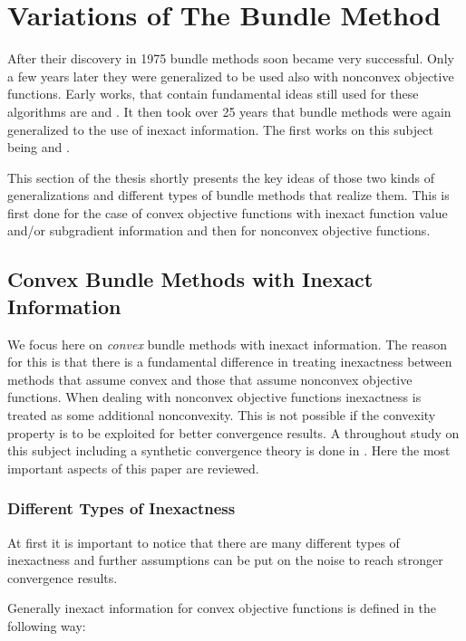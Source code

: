 \section{Variations of The Bundle Method}

After their discovery in 1975 bundle methods soon became very successful. Only a few years later they were generalized to be used also with nonconvex objective functions. Early works, that contain fundamental ideas still used for these algorithms are \cite{Mifflin1982} and \cite{Kiwiel1985}.
It then took over 25 years that bundle methods were again generalized to the use of inexact information. The first works on this subject being \cite{Hintermueller2001,Kiwiel2006} and \cite{Solodov2003}.

This section of the thesis shortly presents the key ideas of those two kinds of generalizations and different types of bundle methods that realize them.
This is first done for the case of convex objective functions with inexact function value and/or subgradient information and then for nonconvex objective functions. 

\subsection{Convex Bundle Methods with Inexact Information}

We focus here on \emph{convex} bundle methods with inexact information. The reason for this is that there is a fundamental difference in treating inexactness between methods that assume convex and those that assume nonconvex objective functions.
When dealing with nonconvex objective functions inexactness is treated as some additional nonconvexity. This is not possible if the convexity property is to be exploited for better convergence results.
A throughout study on this subject including a synthetic convergence theory is done in \cite{Oliveira2014}. Here the most important aspects %
of this paper are reviewed.

\subsubsection{Different Types of Inexactness}

At first it is important to notice that there are many different types of inexactness and further assumptions can be put on the noise to reach stronger convergence results.

Generally inexact information for convex objective functions is defined in the following way:

